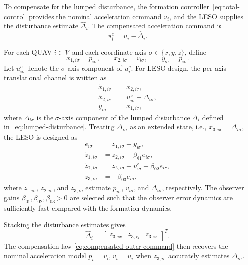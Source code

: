 \documentclass[letterpaper,journal]{IEEEtran}
\theoremstyle{plain}
\theoremstyle{definition}
\theoremstyle{remark}
\begin{document}
To compensate for the lumped disturbance, the formation controller~\eqref{eq:total-control} provides the nominal acceleration command \(u_i\), and the LESO supplies the disturbance estimate \(\hat\Delta_i\). The compensated acceleration command is
\begin{equation}
u_i^c=u_i-\hat\Delta_i.
\label{eq:compensated-outer-command}
\end{equation}

For each QUAV \(i\in\mathcal V\) and each coordinate axis \(\sigma\in\{x,y,z\}\), define
\begin{equation}
x_{1,i\sigma}=p_{i\sigma},\qquad
x_{2,i\sigma}=v_{i\sigma},\qquad
y_{i\sigma}=p_{i\sigma}.
\label{eq:leso-state-definition}
\end{equation}
Let \(u_{i\sigma}^c\) denote the \(\sigma\)-axis component of \(u_i^c\). For LESO design, the per-axis translational channel is written as
\begin{equation}
\begin{aligned}
\dot x_{1,i\sigma}&=x_{2,i\sigma},\\
\dot x_{2,i\sigma}&=u_{i\sigma}^c+\Delta_{i\sigma},\\
y_{i\sigma}&=x_{1,i\sigma},
\end{aligned}
\label{eq:leso-plant-form}
\end{equation}
where \(\Delta_{i\sigma}\) is the \(\sigma\)-axis component of the lumped disturbance \(\Delta_i\) defined in~\eqref{eq:lumped-disturbance}. Treating \(\Delta_{i\sigma}\) as an extended state, i.e., \(x_{3,i\sigma}=\Delta_{i\sigma}\), the LESO is designed as
\begin{equation}
\begin{aligned}
e_{i\sigma}&=z_{1,i\sigma}-y_{i\sigma},\\
\dot z_{1,i\sigma}&=z_{2,i\sigma}-\beta_{01}e_{i\sigma},\\
\dot z_{2,i\sigma}&=z_{3,i\sigma}+u_{i\sigma}^c-\beta_{02}e_{i\sigma},\\
\dot z_{3,i\sigma}&=-\beta_{03}e_{i\sigma},
\end{aligned}
\label{eq:leso-design}
\end{equation}
where \(z_{1,i\sigma}\), \(z_{2,i\sigma}\), and \(z_{3,i\sigma}\) estimate \(p_{i\sigma}\), \(v_{i\sigma}\), and \(\Delta_{i\sigma}\), respectively. The observer gains \(\beta_{01},\beta_{02},\beta_{03}>0\) are selected such that the observer error dynamics are sufficiently fast compared with the formation dynamics.

Stacking the disturbance estimates gives
\begin{equation}
\hat\Delta_i=
\begin{bmatrix}
z_{3,ix}&z_{3,iy}&z_{3,iz}
\end{bmatrix}^{T}.
\label{eq:leso-disturbance-stack}
\end{equation}
The compensation law \eqref{eq:compensated-outer-command} then recovers the nominal acceleration model \(\dot p_i=v_i\), \(\dot v_i=u_i\) when \(z_{3,i\sigma}\) accurately estimates \(\Delta_{i\sigma}\).
\end{document}
